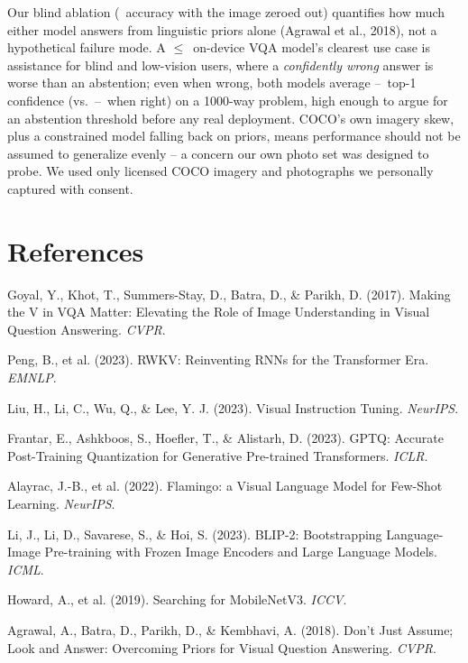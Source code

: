 \documentclass[final]{article}
\begin{document}
Our blind ablation (\blindFloor\ accuracy with the image zeroed out) quantifies how much either
model answers from linguistic priors alone (Agrawal et al., 2018), not a hypothetical failure mode.
A $\le$\primaryTotalSize\ on-device VQA model's clearest use case is assistance for blind and
low-vision users, where a \emph{confidently wrong} answer is worse than an abstention; even when
wrong, both models average \primaryConfIncorrect--\baselineConfIncorrect\ top-1 confidence (vs.\
\primaryConfCorrect--\baselineConfCorrect\ when right) on a 1000-way problem, high enough to argue
for an abstention threshold before any real deployment. COCO's own
imagery skew, plus a constrained model falling back on priors, means performance should not be
assumed to generalize evenly -- a concern our own photo set was designed to probe. We used only
licensed COCO imagery and photographs we personally captured with consent.

\newpage
\section*{References}
Goyal, Y., Khot, T., Summers-Stay, D., Batra, D., \& Parikh, D. (2017). Making the V in VQA
Matter: Elevating the Role of Image Understanding in Visual Question Answering. \emph{CVPR}.

Peng, B., et al. (2023). RWKV: Reinventing RNNs for the Transformer Era. \emph{EMNLP}.

Liu, H., Li, C., Wu, Q., \& Lee, Y. J. (2023). Visual Instruction Tuning. \emph{NeurIPS}.

Frantar, E., Ashkboos, S., Hoefler, T., \& Alistarh, D. (2023). GPTQ: Accurate Post-Training
Quantization for Generative Pre-trained Transformers. \emph{ICLR}.

Alayrac, J.-B., et al. (2022). Flamingo: a Visual Language Model for Few-Shot Learning.
\emph{NeurIPS}.

Li, J., Li, D., Savarese, S., \& Hoi, S. (2023). BLIP-2: Bootstrapping Language-Image Pre-training
with Frozen Image Encoders and Large Language Models. \emph{ICML}.

Howard, A., et al. (2019). Searching for MobileNetV3. \emph{ICCV}.

Agrawal, A., Batra, D., Parikh, D., \& Kembhavi, A. (2018). Don't Just Assume; Look and Answer:
Overcoming Priors for Visual Question Answering. \emph{CVPR}.
\end{document}
